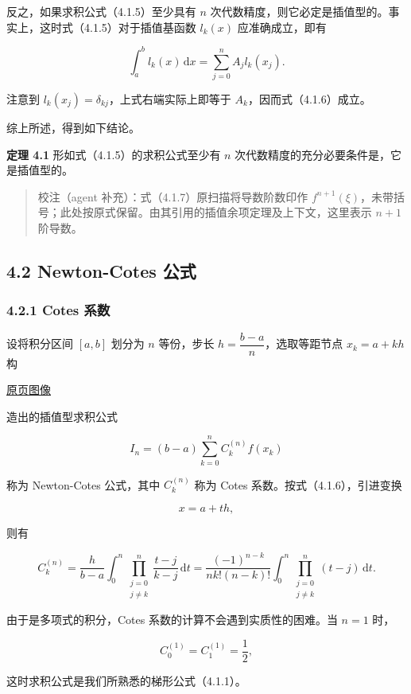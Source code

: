 \documentclass[
  10pt,
  fontset=fandol]{ctexart}
\begin{document}
反之，如果求积公式（4.1.5）至少具有 \(n\) 次代数精度，则它必定是插值型的。事实上，这时式（4.1.5）对于插值基函数 \(l_k(x)\) 应准确成立，即有

\[
\int_a^b l_k(x)\,\mathrm{d}x=\sum_{j=0}^n A_jl_k(x_j).
\]

注意到 \(l_k(x_j)=\delta_{kj}\)，上式右端实际上即等于 \(A_k\)，因而式（4.1.6）成立。

综上所述，得到如下结论。

\textbf{定理 4.1} 形如式（4.1.5）的求积公式至少有 \(n\) 次代数精度的充分必要条件是，它是插值型的。

\begin{quote}
校注（agent 补充）：式（4.1.7）原扫描将导数阶数印作 \(f^{n+1}(\xi)\)，未带括号；此处按原式保留。由其引用的插值余项定理及上下文，这里表示 \(n+1\) 阶导数。
\end{quote}

\subsection{4.2 Newton-Cotes 公式}\label{newton-cotes-ux516cux5f0f}

\subsubsection{4.2.1 Cotes 系数}\label{cotes-ux7cfbux6570}

设将积分区间 \([a,b]\) 划分为 \(n\) 等份，步长 \(h=\dfrac{b-a}{n}\)，选取等距节点 \(x_k=a+kh\) 构

\href{../../source-images/pdf-096.jpeg}{原页图像}

造出的插值型求积公式

\[
I_n=(b-a)\sum_{k=0}^n C_k^{(n)}f(x_k)
\tag{4.2.1}
\]

称为 Newton-Cotes 公式，其中 \(C_k^{(n)}\) 称为 Cotes 系数。按式（4.1.6），引进变换

\[
x=a+th,
\]

则有

\[
C_k^{(n)}=\frac{h}{b-a}\int_0^n\prod_{\substack{j=0\\j\ne k}}^n\frac{t-j}{k-j}\,\mathrm{d}t
=\frac{(-1)^{n-k}}{nk!(n-k)!}\int_0^n\prod_{\substack{j=0\\j\ne k}}^n(t-j)\,\mathrm{d}t.
\tag{4.2.2}
\]

由于是多项式的积分，Cotes 系数的计算不会遇到实质性的困难。当 \(n=1\) 时，

\[
C_0^{(1)}=C_1^{(1)}=\frac12,
\]

这时求积公式是我们所熟悉的梯形公式（4.1.1）。
\end{document}
